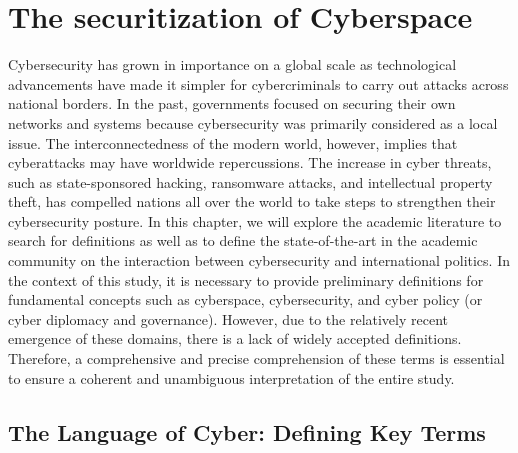 \chapter{The securitization of Cyberspace}


Cybersecurity has grown in importance on a global scale as technological advancements have made it simpler for cybercriminals to carry out attacks across national borders. In the past, governments focused on securing their own networks and systems because cybersecurity was primarily considered as a local issue. The interconnectedness of the modern world, however, implies that cyberattacks may have worldwide repercussions. The increase in cyber threats, such as state-sponsored hacking, ransomware attacks, and intellectual property theft, has compelled nations all over the world to take steps to strengthen their cybersecurity posture. 
In this chapter, we will explore the academic literature to search for definitions as well as to define the state-of-the-art in the academic community on the interaction between cybersecurity and international politics. In the context of this study, it is necessary to provide preliminary definitions for fundamental concepts such as cyberspace, cybersecurity, and cyber policy (or cyber diplomacy and governance). However, due to the relatively recent emergence of these domains, there is a lack of widely accepted definitions. Therefore, a comprehensive and precise comprehension of these terms is essential to ensure a coherent and unambiguous interpretation of the entire study. 

\section{The Language of Cyber: Defining Key Terms}


